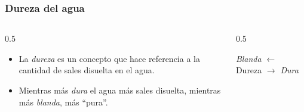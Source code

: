 \documentclass[11pt, aspectratio=169, xcolor=table]{beamer}
\begin{document}
\begin{frame}
  \frametitle{Dureza del agua}
  \begin{columns}
    \begin{column}{0.5\textwidth}
      \begin{itemize}
        \item La \textit{dureza} es un concepto que hace referencia a la cantidad de sales disuelta en el agua.
        \item Mientras más \textit{dura} el agua más sales disuelta, mientras más \textit{blanda}, más ``pura''.
      \end{itemize}
    \end{column}
    \begin{column}{0.5\textwidth}
      \begin{definition}
        \begin{center}
          \textit{Blanda} $\leftarrow$ Dureza $\rightarrow$ \textit{Dura}  
        \end{center}
      \end{definition}
    \end{column}
  \end{columns}
\end{frame}
\end{document}

